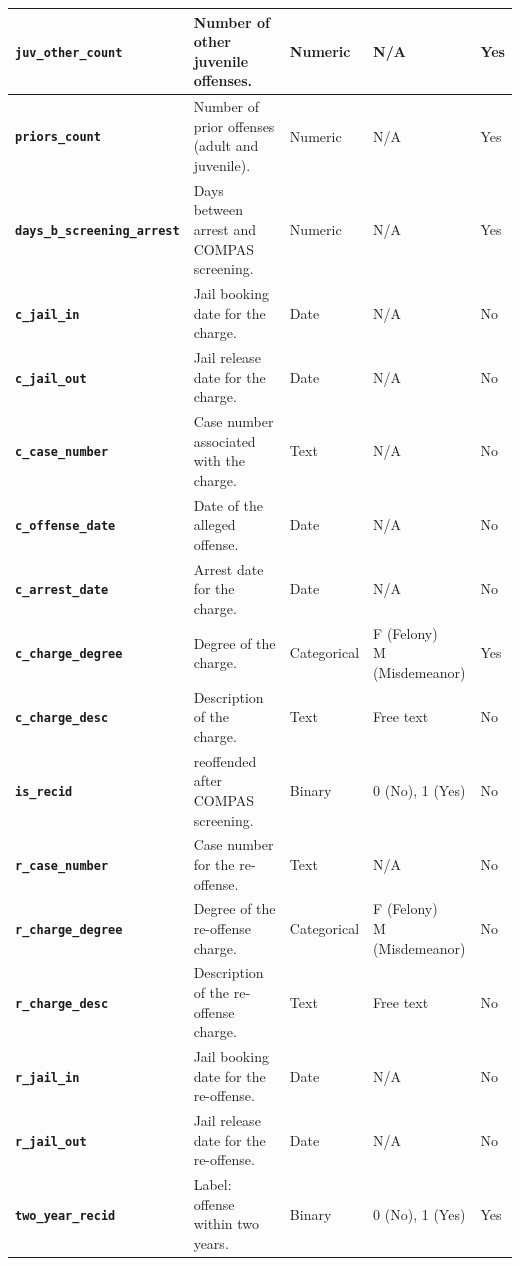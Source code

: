 \documentclass[conference]{IEEEtran}
\begin{document}
\begin{table}[!ht]
\begin{tabular}{|l|l|l|l|l|}
		\textbf{\texttt{juv\_other\_count}}	&	Number of other juvenile offenses.	&	Numeric	&	N/A	&	Yes \\ \hline
		\textbf{\texttt{priors\_count}}	&	Number of prior offenses (adult and juvenile).	&	Numeric	&	N/A	&	Yes \\ \hline
		\textbf{\texttt{days\_b\_screening\_arrest}}	&	Days between arrest and COMPAS screening.	&	Numeric	&	N/A	&	Yes \\ \hline
		\textbf{\texttt{c\_jail\_in}}	&	Jail booking date for the charge.	&	Date	&	N/A	&	No \\ \hline
		\textbf{\texttt{c\_jail\_out}}	&	Jail release date for the charge.	&	Date	&	N/A	&	No \\ \hline
		\textbf{\texttt{c\_case\_number}}	&	Case number associated with the charge.	&	Text	&	N/A	&	No \\ \hline
		\textbf{\texttt{c\_offense\_date}}	&	Date of the alleged offense.	&	Date	&	N/A	&	No \\ \hline
		\textbf{\texttt{c\_arrest\_date}}	&	Arrest date for the charge.	&	Date	&	N/A	&	No \\ \hline
		\textbf{\texttt{c\_charge\_degree}}	&	Degree of the charge.	&	Categorical	&	\makecell[l]{F (Felony)\\M (Misdemeanor)}	&	Yes \\ \hline
		\textbf{\texttt{c\_charge\_desc}}	&	Description of the charge.	&	Text	&	Free text	&	No \\ \hline
		\textbf{\texttt{is\_recid}}	&	reoffended after COMPAS screening.	&	Binary	&	0 (No), 1 (Yes)	&	No \\ \hline
		\textbf{\texttt{r\_case\_number}}	&	Case number for the re-offense.	&	Text	&	N/A	&	No \\ \hline
		\textbf{\texttt{r\_charge\_degree}}	&	Degree of the re-offense charge.	&	Categorical	&	\makecell[l]{F (Felony)\\M (Misdemeanor)}	&	No \\ \hline
		\textbf{\texttt{r\_charge\_desc}}	&	Description of the re-offense charge.	&	Text	&	Free text	&	No \\ \hline
		\textbf{\texttt{r\_jail\_in}}	&	Jail booking date for the re-offense.	&	Date	&	N/A	&	No \\ \hline
		\textbf{\texttt{r\_jail\_out}}	&	Jail release date for the re-offense.	&	Date	&	N/A	&	No \\ \hline
		\textbf{\texttt{two\_year\_recid}}	&	Label: offense within two years.	&	Binary	&	0 (No), 1 (Yes)	&	Yes \\ \hline

\end{tabular}
\end{table}
\end{document}
